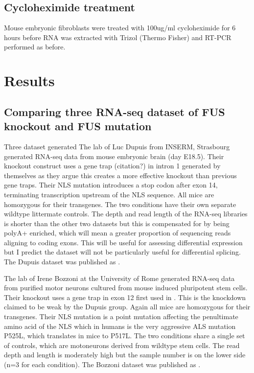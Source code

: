 \subsection{Cycloheximide treatment}
Mouse embryonic fibroblasts were treated with 100ug/ml cycloheximide for 6 hours before RNA was extracted with Trizol (Thermo Fisher) and RT-PCR performed as before. 


\clearpage



\section{Results}

\subsection{ Comparing three RNA-seq dataset of FUS knockout and FUS mutation}

Three dataset generated
The lab of Luc Dupuis from INSERM, Strasbourg generated RNA-seq data from mouse embryonic brain (day E18.5). Their knockout construct uses a gene trap (citation?) in intron 1 generated by themselves as they argue this creates a more effective knockout than previous gene traps.  
Their NLS mutation introduces a stop codon after exon 14, terminating transcription upstream of the NLS sequence. 
All mice are homozygous for their transgenes. 
The two conditions have their own separate wildtype littermate controls. 
The depth and read length of the RNA-seq libraries is shorter than the other two datasets but this is compensated for by being polyA+ enriched, which will mean a greater proportion of sequencing reads aligning to coding exons.  
This will be useful for assessing differential expression but I predict the dataset will not be particularly useful for differential splicing.
The Dupuis dataset was published as \citep{Scekic-zahirovic2016}.

The lab of Irene Bozzoni at the University of Rome generated RNA-seq data from purified motor neurons cultured from mouse induced pluripotent stem cells. Their knockout uses a gene trap in exon 12 first used in \citep{Hicks2000}. 
This is the knockdown claimed to be weak by the Dupuis group.
Again all mice are homozygous for their transgenes.
Their NLS mutation is a point mutation affecting the penultimate amino acid of the NLS which in humans is the very aggressive ALS mutation P525L, which translates in mice to P517L.  
The two conditions share a single set of controls, which are motoneurons derived from wildtype stem cells.
The read depth and length is moderately high but the sample number is on the lower side (n=3 for each condition).
The Bozzoni dataset was published as \citep{Capauto2018}.


